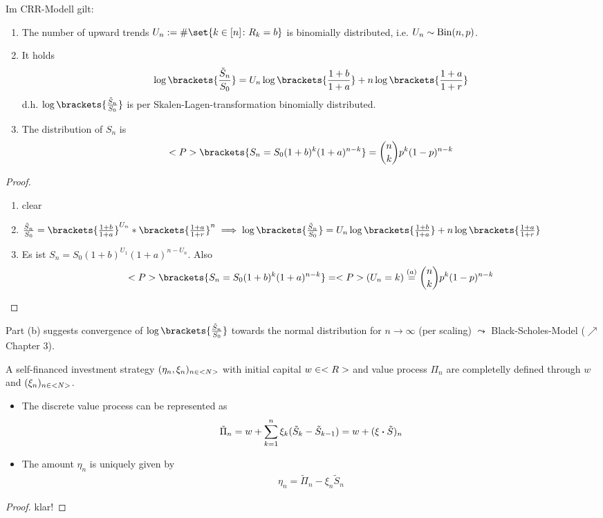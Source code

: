 \begin{proposition} %
	Im CRR-Modell gilt:
	\begin{enumerate}
		\item The number of upward trends $U_n := \# \set{k \in [n] \colon R_k = b}$ is binomially distributed, i.e. $U_n \sim \operatorname{Bin}(n,p)$.
		\item It holds
		\begin{align*}
			\log\brackets{\frac{\tilde{S}_n}{S_0}} = U_n \log\brackets{\frac{1+b}{1+a}} + n \log\brackets{\frac{1+a}{1+r}}
		\end{align*}
		d.h. $\log\brackets{\frac{\tilde{S}_n}{S_0}}$ is per Skalen-Lagen-transformation binomially distributed. 
		\item The distribution of $S_n$ is
		\begin{align*}
			\P\brackets{S_n = S_0 (1+b)^k (1+a)^{n-k}} = \binom{n}{k} p^k (1-p)^{n-k}
		\end{align*} 
	\end{enumerate}
\end{proposition}
\begin{proof}
	\begin{enumerate}
		\item clear
		\item $\frac{\tilde{S}_n}{S_0} = \brackets{\frac{1+b}{1+a}}^{U_n} * \brackets{\frac{1+a}{1+r}}^n \implies \log\brackets{\frac{\tilde{S}_n}{S_0}} = U_n \log\brackets{\frac{1+b}{1+a}} + n \log\brackets{\frac{1+a}{1+r}}$
		\item Es ist $S_n = S_0 (1+b)^{U_1}(1+a)^{n-U_n} $. Also
		\begin{align*}
			\P\brackets{S_n = S_0 (1+b)^k (1+a)^{n-k}} = \P(U_n = k) \overset{(a)}{=} \binom{n}{k} p^k (1-p)^{n-k}
		\end{align*}
	\end{enumerate}
\end{proof}
\begin{*remark}
	Part (b) suggests convergence of $\log\brackets{\frac{\tilde{S}_n}{S_0}}$ towards the normal distribution for $n \to \infty$ (per scaling) 
	$\leadsto$ Black-Scholes-Model ($\nearrow$ Chapter 3).
\end{*remark}
\begin{lemma} %
	A self-financed investment strategy $(\eta_n,\xi_n)_{n\in <N>}$ with initial capital $w \in <R>$ and value process $\Pi_n$ are completelly defined through $w$ and $(\xi_n)_{n \in <N>}$.
	\begin{itemize}
		\item The discrete value process can be represented as
		\begin{align*}
			\tilde{\Pi}_n = w + \sum_{k=1}^n \xi_k (\tilde{S}_k - \tilde{S}_{k-1}) = w + (\xi \boldsymbol{\cdot} \tilde{S})_n
		\end{align*}
		\item The amount $\eta_n$ is uniquely given by 
		\begin{align*}
			\eta_n = \tilde{\Pi}_n - \xi_n \tilde{S}_n
		\end{align*}
	\end{itemize}
\end{lemma}
\begin{proof}
	klar!
\end{proof}

